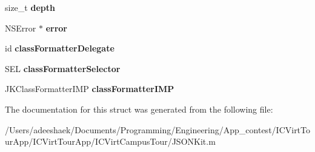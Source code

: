 \begin{DoxyCompactItemize}
\item 
\hypertarget{struct_j_k_encode_state_a820c167ceaaa9759b0ca2695d22db55c}{size\-\_\-t {\bfseries depth}}\label{struct_j_k_encode_state_a820c167ceaaa9759b0ca2695d22db55c}

\item 
\hypertarget{struct_j_k_encode_state_aa4a96b60b18f49477d1c840bb272eceb}{N\-S\-Error $\ast$ {\bfseries error}}\label{struct_j_k_encode_state_aa4a96b60b18f49477d1c840bb272eceb}

\item 
\hypertarget{struct_j_k_encode_state_a3276f95dc9c96996c2cca8a51c670a43}{id {\bfseries class\-Formatter\-Delegate}}\label{struct_j_k_encode_state_a3276f95dc9c96996c2cca8a51c670a43}

\item 
\hypertarget{struct_j_k_encode_state_acc528c9381ebec1bd0fee12e19075782}{S\-E\-L {\bfseries class\-Formatter\-Selector}}\label{struct_j_k_encode_state_acc528c9381ebec1bd0fee12e19075782}

\item 
\hypertarget{struct_j_k_encode_state_a8a9a4e89429ce2e5b8eece1f3134a9df}{J\-K\-Class\-Formatter\-I\-M\-P {\bfseries class\-Formatter\-I\-M\-P}}\label{struct_j_k_encode_state_a8a9a4e89429ce2e5b8eece1f3134a9df}

\end{DoxyCompactItemize}


The documentation for this struct was generated from the following file\-:\begin{DoxyCompactItemize}
\item 
/\-Users/adeeshaek/\-Documents/\-Programming/\-Engineering/\-App\-\_\-contest/\-I\-C\-Virt\-Tour\-App/\-I\-C\-Virt\-Tour\-App/\-I\-C\-Virt\-Campus\-Tour/J\-S\-O\-N\-Kit.\-m\end{DoxyCompactItemize}

